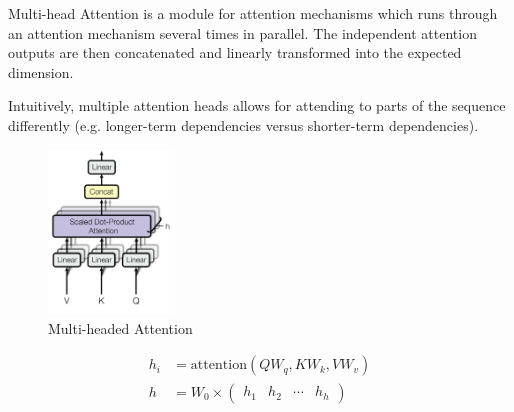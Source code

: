 \begin{definition}
    Multi-head Attention is a module for attention mechanisms which runs through an attention mechanism several times in parallel. The independent attention outputs are then concatenated and linearly transformed into the expected dimension.
    
    Intuitively, multiple attention heads allows for attending to parts of the sequence differently (e.g. longer-term dependencies versus shorter-term dependencies).

\begin{figure}[H]
\includegraphics[width=0.3\textwidth]{pic/04/multi-headed-attention.png}
\centering
\caption{Multi-headed Attention}
\end{figure}
\end{definition}

\begin{equation}
    \begin{aligned}
        h_i &= \mathrm{attention}(Q W_q, K W_k, V W_v ) \\
        h &= W_0 \times \begin{pmatrix}
            h_1 & h_2 & \cdots & h_h
        \end{pmatrix}
    \end{aligned}
\end{equation}


